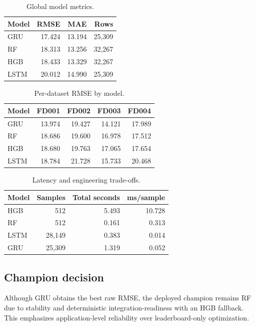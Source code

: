 \documentclass[11pt]{article}
\begin{document}
\begin{table}[H]
\centering
\caption{Global model metrics.}
\label{tab:global_metrics}
\begin{tabular}{lrrr}
\toprule
Model & RMSE & MAE & Rows \\
\midrule
GRU & 17.424 & 13.194 & 25,309 \\
RF & 18.313 & 13.256 & 32,267 \\
HGB & 18.433 & 13.329 & 32,267 \\
LSTM & 20.012 & 14.990 & 25,309 \\
\bottomrule
\end{tabular}
\end{table}

\begin{table}[H]
\centering
\caption{Per-dataset RMSE by model.}
\label{tab:dataset_metrics}
\begin{tabular}{lrrrr}
\toprule
Model & FD001 & FD002 & FD003 & FD004 \\
\midrule
GRU & 13.974 & 19.427 & 14.121 & 17.989 \\
RF & 18.686 & 19.600 & 16.978 & 17.512 \\
HGB & 18.680 & 19.763 & 17.065 & 17.654 \\
LSTM & 18.784 & 21.728 & 15.733 & 20.468 \\
\bottomrule
\end{tabular}
\end{table}

\begin{table}[H]
\centering
\caption{Latency and engineering trade-offs.}
\label{tab:latency}
\begin{tabular}{lrrr}
\toprule
Model & Samples & Total seconds & ms/sample \\
\midrule
HGB & 512 & 5.493 & 10.728 \\
RF & 512 & 0.161 & 0.313 \\
LSTM & 28,149 & 0.383 & 0.014 \\
GRU & 25,309 & 1.319 & 0.052 \\
\bottomrule
\end{tabular}
\end{table}

\subsection{Champion decision}
Although GRU obtains the best raw RMSE, the deployed champion remains RF due to stability and deterministic integration-readiness with an HGB fallback. This emphasizes application-level reliability over leaderboard-only optimization.
\end{document}
